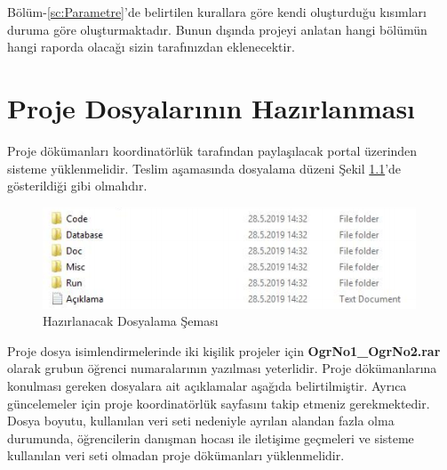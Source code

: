 Bölüm-\ref{sc:Parametre}'de belirtilen kurallara göre \latex kendi oluşturduğu kısımları duruma göre oluşturmaktadır. Bunun dışında projeyi anlatan hangi bölümün hangi raporda olacağı sizin tarafınızdan eklenecektir.  

\chapter{Proje Dosyalarının Hazırlanması}

Proje dökümanları koordinatörlük tarafından paylaşılacak portal üzerinden sisteme yüklenmelidir. Teslim aşamasında dosyalama düzeni Şekil \ref{fig:fileSchema}'de gösterildiği gibi olmalıdır. 

\begin{figure}[!h]
    \centering
    \includegraphics[]{ScreenShot 3.png}
    \caption{Hazırlanacak Dosyalama Şeması}
    \label{fig:fileSchema}
\end{figure}

Proje dosya isimlendirmelerinde iki kişilik projeler için \textbf{OgrNo1\_OgrNo2.rar} olarak grubun öğrenci numaralarının yazılması yeterlidir. Proje dökümanlarına konulması gereken dosyalara ait açıklamalar aşağıda belirtilmiştir. Ayrıca güncelemeler için proje koordinatörlük sayfasını takip etmeniz gerekmektedir. Dosya boyutu, kullanılan veri seti nedeniyle ayrılan alandan fazla olma durumunda, öğrencilerin danışman hocası ile iletişime geçmeleri ve sisteme kullanılan veri seti olmadan proje dökümanları yüklenmelidir.

